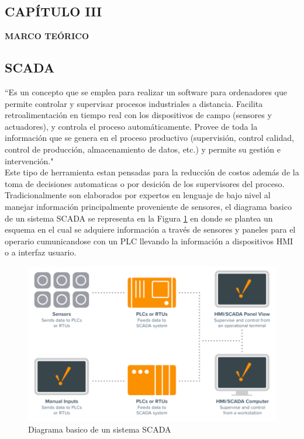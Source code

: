 \begin{center}
    \setcounter{section}{3}
    \setcounter{subsection}{0}
    \section*{CAPÍTULO III}
    \vspace*{0.5in}
    \textbf{MARCO TEÓRICO}
\end{center}

\subsection{SCADA}
    ``Es un concepto que se emplea para realizar un software 
    para ordenadores que permite controlar y supervisar 
    procesos industriales a distancia. Facilita 
    retroalimentación en tiempo real con los 
    dispositivos de campo (sensores y actuadores), y 
    controla el proceso automáticamente. Provee de toda 
    la información que se genera en el proceso 
    productivo (supervisión, control calidad, control de
    producción, almacenamiento de datos, etc.) y 
    permite su gestión e intervención." \textcolor{blue}{\cite{SCADA}}\\

    Este tipo de herramienta estan pensadas para la reducción de costos además de la toma de decisiones automaticas o por 
    desición de los supervisores del proceso. Tradicionalmente son elaborados por expertos en lenguaje de bajo nivel 
    al manejar información principalmente proveniente de sensores, el diagrama basico de un sistema SCADA se representa
    en la Figura \ref{fig:estructura} en donde se plantea un esquema en el cual se adquiere información a través de sensores
    y paneles para el operario cumunicandose con un PLC llevando la información a dispositivos HMI o a interfaz usuario. \\

    \begin{figure}[H]
        \centering
        \includegraphics[scale=0.4]
        {EstructuraSCADA.png}
        \caption{Diagrama basico de un sistema SCADA}
    \label{fig:estructura}
    \end{figure}


